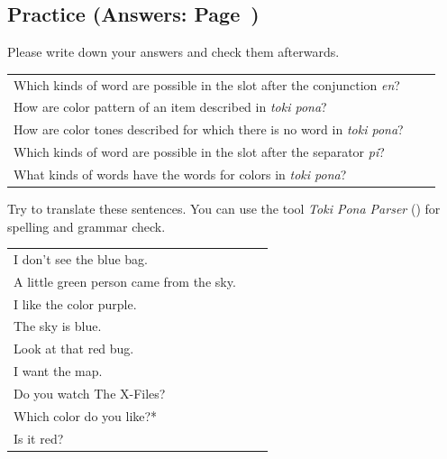 \subsection*{Practice (Answers: Page~\pageref{'colors'})}
%
Please write down your answers and check them afterwards.

\begin{supertabular}{p{5,5cm}|ll}
    Which kinds of word are possible in the slot after the conjunction \textit{en}? &  & \\ %
    How are color pattern of an item described in \textit{toki pona}?               &  & \\ %
    How are color tones described for which there is no word in \textit{toki pona}? &  & \\ %
    Which kinds of word are possible in the slot after the separator \textit{pi}?   &  & \\ %
    What kinds of words have the words for colors in \textit{toki pona}?            &  & \\ %
\end{supertabular}

Try to translate these sentences.
You can use the tool \textit{Toki Pona Parser} (\cite{www:rowa:02}) for spelling and grammar check.

\begin{supertabular}{p{5,5cm}|ll}
    I don't see the blue bag.                &  & \\ %
    A little green person came from the sky. &  & \\ %
    I like the color purple.                 &  & \\ %
    The sky is blue.                         &  & \\ %
    Look at that red bug.                    &  & \\ %
    I want the map.                          &  & \\ %
    Do you watch The X-Files?                &  & \\  %
    Which color do you like?*                &  & \\  %
    Is it red?                               &  & \\ %
\end{supertabular}


